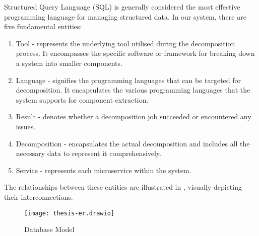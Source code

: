 Structured Query Language (SQL) is generally considered the most effective
programming language for managing structured data. In our system, there are
five fundamental entities:

\begin{enumerate}
  \item Tool - represents the underlying tool utilised during the decomposition
    process. It encompasses the specific software or framework for breaking
    down a system into smaller components.
  \item Language - signifies the programming languages that can be targeted for
    decomposition. It encapsulates the various programming languages that the
    system supports for component extraction.
  \item Result - denotes whether a decomposition job succeeded or encountered
    any issues.
  \item Decomposition - encapsulates the actual decomposition and includes all
    the necessary data to represent it comprehensively.
  \item Service - represents each microservice within the system.
\end{enumerate}

The relationships between these entities are illustrated in
, visually depicting their interconnections.

\begin{figure*}[!htb]
  \centering
  \texttt{[image: thesis-er.drawio]}
  \caption{Database Model}
  \label{fig:database-model}
\end{figure*}
